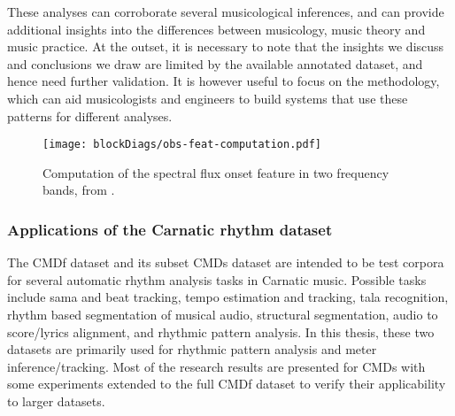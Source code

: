 These analyses can corroborate several musicological inferences, and can provide additional insights into the differences between musicology, music theory and music practice. At the outset, it is necessary to note that the insights we discuss and conclusions we draw are limited by the available annotated dataset, and hence need further validation. It is however useful to focus on the methodology, which can aid musicologists and engineers to build systems that use these patterns for different analyses. 
\begin{figure}
\centering	
\texttt{[image: blockDiags/obs-feat-computation.pdf]}
	\caption[Computation of the spectral flux feature]{Computation of the spectral flux onset feature in two frequency bands, from .}
	\label{fig:obs:featcomp}
\end{figure}


\subsubsection{Applications of the Carnatic rhythm dataset}
The \acrshort{CMDf} dataset and its subset \acrshort{CMDs} dataset are intended to be test corpora for several automatic rhythm analysis tasks in Carnatic music. Possible tasks include \gls{sama} and beat tracking, tempo estimation and tracking, \gls{tala} recognition, rhythm based segmentation of musical audio, structural segmentation, audio to score/lyrics alignment, and rhythmic pattern analysis. In this thesis, these two datasets are primarily used for rhythmic pattern analysis and meter inference/tracking. Most of the research results are presented for \acrshort{CMDs} with some experiments extended to the full \acrshort{CMDf} dataset to verify their applicability to larger datasets.%
%
%
%
%
%
